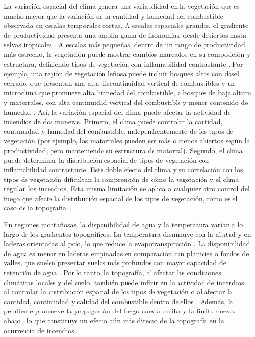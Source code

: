 La variación espacial del clima genera una variabilidad en la vegetación que es mucho mayor que la variación en la cantidad y humedad del combustible observada en escalas temporales cortas. A escalas espaciales grandes, el gradiente de productividad presenta una amplia gama de fisonomías, desde desiertos hasta selvas tropicales \citep{churkina_contrasting_1998, chen_effects_2007, bilgili_net_2020}. A escalas más pequeñas, dentro de un rango de productividad más estrecho, la vegetación puede mostrar cambios marcados en su composición y estructura, definiendo tipos de vegetación con inflamabilidad contrastante \citep{mitchell_ecological_2009}. Por ejemplo, una región de vegetación leñosa puede incluir bosques altos con dosel cerrado, que presentan una alta discontinuidad vertical de combustibles y un microclima que promueve alta humedad del combustible, o bosques de baja altura y matorrales, con alta continuidad vertical del combustible y menor contenido de humedad \citep{kitzberger_firevegetation_2016}. Así, la variación espacial del clima puede afectar la actividad de incendios de dos maneras. Primero, el clima puede controlar la cantidad, continuidad y humedad del combustible, independientemente de los tipos de vegetación (por ejemplo, los matorrales pueden ser más o menos abiertos según la productividad, pero manteniendo su estructura de matorral). Segundo, el clima puede determinar la distribución espacial de tipos de vegetación con inflamabilidad contrastante. Este doble efecto del clima y su correlación con los tipos de vegetación dificultan la comprensión de cómo la vegetación y el clima regulan los incendios. Esta misma limitación se aplica a cualquier otro control del fuego que afecte la distribución espacial de los tipos de vegetación, como es el caso de la topografía.

En regiones montañosas, la disponibilidad de agua y la temperatura varían a lo largo de los gradientes topográficos. La temperatura disminuye con la altitud y en laderas orientadas al polo, lo que reduce la evapotranspiración \citep{holden_modeling_2011, mendez-toribio_effects_2016, jucker_canopy_2018, simon_interior_2024}. La disponibilidad de agua es menor en laderas empinadas en comparación con planicies o fondos de valles, que suelen presentar suelos más profundos con mayor capacidad de retención de agua \citep{holden_modeling_2011, dobrowski_climatic_2011, jucker_canopy_2018}. Por lo tanto, la topografía, al afectar las condiciones climáticas locales y del suelo, también puede influir en la actividad de incendios al controlar la distribución espacial de los tipos de vegetación o al afectar la cantidad, continuidad y calidad del combustible dentro de ellos \citep{iniguez_topography_2008, holsinger_weather_2016, flatley_climatic_2011}. Además, la pendiente promueve la propagación del fuego cuesta arriba y la limita cuesta abajo \citep{rothermel_how_1983}, lo que constituye un efecto aún más directo de la topografía en la ocurrencia de incendios.

